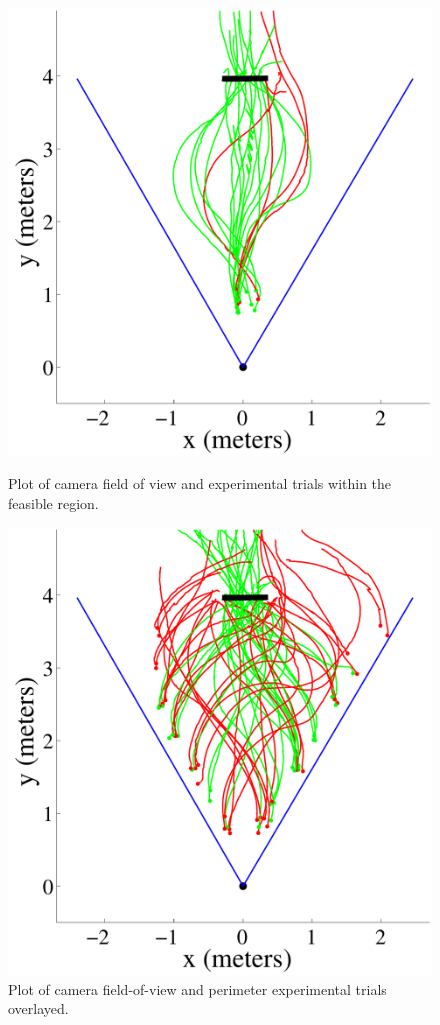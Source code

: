 \documentclass{aamas2013}
\begin{document}
\begin{figure}[tb]
\begin{minipage}[b]{0.45\linewidth}
\centering
\includegraphics[width=\linewidth]{figures/flight_paths_feasible.pdf}
\caption{Plot of camera field of view and experimental trials within the feasible region.}
\label{fig:flight_paths_feasible}
\end{minipage}
\hfill
\begin{minipage}[b]{0.45\linewidth}
\centering
\includegraphics[width=\textwidth]{figures/flight_paths.pdf}
\caption{Plot of camera field-of-view and perimeter experimental trials overlayed.}
\label{fig:flight_paths}
\end{minipage}
\end{figure}
\end{document}
